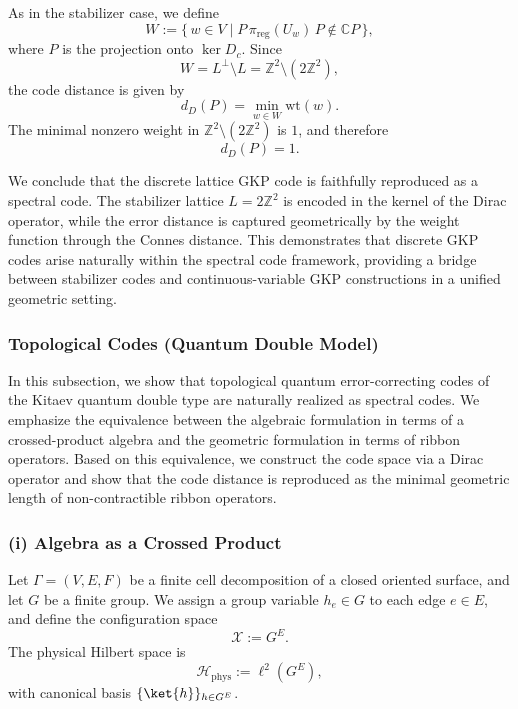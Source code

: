 \documentclass[12pt]{article}
\theoremstyle{definition} %
\theoremstyle{plain} %
\theoremstyle{remark} %
\theoremstyle{underline}
\begin{document}
As in the stabilizer case, we define
\[
    W:=\{\,w\in V\mid P\,\pi_{\mathrm{reg}}(U_w)\,P\notin\mathbb{C}P\,\},
\]
where $P$ is the projection onto $\ker D_c$.
Since
\[
    W=L^\perp\setminus L
    =\mathbb{Z}^2\setminus(2\mathbb{Z}^2),
\]
the code distance is given by
\[
    d_D(P)=\min_{w\in W}\mathrm{wt}(w).
\]
The minimal nonzero weight in $\mathbb{Z}^2\setminus(2\mathbb{Z}^2)$ is $1$, and
therefore
\[
    d_D(P)=1.
\]

We conclude that the discrete lattice GKP code is faithfully reproduced as a spectral code. The stabilizer lattice $L=2\mathbb{Z}^2$ is encoded in the kernel of the Dirac operator, while the error distance is captured geometrically by the weight function through the Connes distance.
This demonstrates that discrete GKP codes\cite{gottesman2000encoding} arise naturally within the spectral code framework, providing a bridge between stabilizer codes and continuous-variable GKP constructions in a unified geometric setting.



\subsubsection{Topological Codes (Quantum Double Model)}

In this subsection, we show that topological quantum error-correcting codes of the Kitaev quantum double type are naturally realized as spectral codes.
We emphasize the equivalence between the algebraic formulation in terms of a crossed-product algebra and the geometric formulation in terms of ribbon operators. Based on this equivalence, we construct the code space via a Dirac operator and show that the code distance is reproduced as the minimal geometric length of non-contractible ribbon operators.

\subsubsection*{(i) Algebra as a Crossed Product}

Let $\Gamma=(V,E,F)$ be a finite cell decomposition of a closed oriented surface, and let $G$ be a finite group.
We assign a group variable $h_e\in G$ to each edge $e\in E$, and define the configuration space
\[
    \mathcal X := G^{E}.
\]
The physical Hilbert space is
\[
    \mathcal H_{\mathrm{phys}} := \ell^2(G^{E}),
\]
with canonical basis $\{\ket{h}\}_{h\in G^{E}}$.
\end{document}
